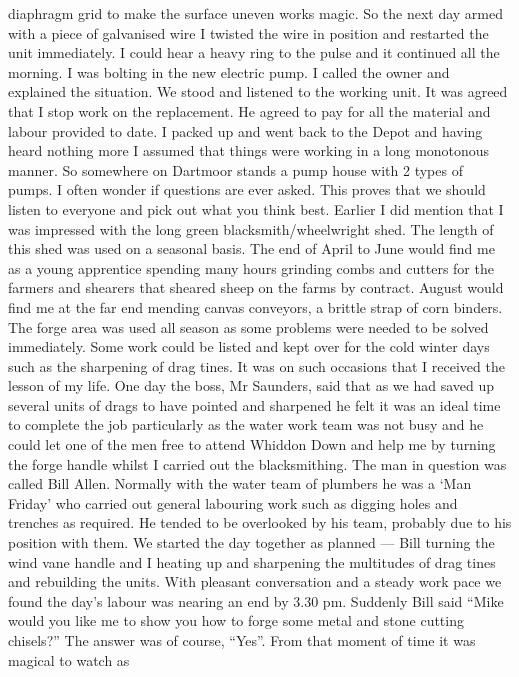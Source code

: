diaphragm grid to make the surface uneven works magic.  So the next day armed
with a piece of galvanised wire I twisted the wire in position and restarted
the unit immediately.  I could hear a heavy ring to the pulse and it continued
all the morning.  I was bolting in the new electric pump.  I called the owner
and explained the situation.  We stood and listened to the working unit.  It
was agreed that I stop work on the replacement.  He agreed to pay for all the
material and labour provided to date.  I packed up and went back to the Depot
and having heard nothing more I assumed that things were working in a long
monotonous manner.  So somewhere on Dartmoor stands a pump house with 2 types
of pumps.   I often wonder if questions are ever asked.  This proves that we
should listen to everyone and pick out what you think best. Earlier I did
mention that I was impressed with the long green blacksmith/wheelwright shed.
The length of this shed was used on a seasonal basis.  The end of April to June
would find me as a young apprentice spending many hours grinding combs and
cutters for the farmers and shearers that sheared sheep on the farms by
contract.  August would find me at the far end mending canvas conveyors, a
brittle strap of corn binders. The forge area was used all season as some
problems were needed to be solved immediately.  Some work could be listed and
kept over for the cold winter days such as the sharpening of drag tines.  It
was on such occasions that I received the lesson of my life. One day the boss,
Mr Saunders, said that as we had saved up several units of drags to have
pointed and sharpened he felt it was an ideal time to complete the job
particularly as the water work team was not busy and he could let one of the
men free to attend Whiddon Down and help me by turning the forge handle whilst
I carried out the blacksmithing.  The man in question was called Bill Allen.
Normally with the water team of plumbers he was a ‘Man Friday' who carried out
general labouring work such as digging holes and trenches as required.  He
tended to be overlooked by his team, probably due to his position with them. We
started the day together as planned --- Bill turning the wind vane handle and I
heating up and sharpening the multitudes  of drag tines and rebuilding the
units.  With pleasant conversation and a steady work pace we found the day's
labour was nearing an end by 3.30 pm.  Suddenly Bill said ``Mike would you like
me to show you how to forge some metal and stone cutting chisels?''  The answer
was of course, ``Yes''.  From that moment of time it was magical to watch as
